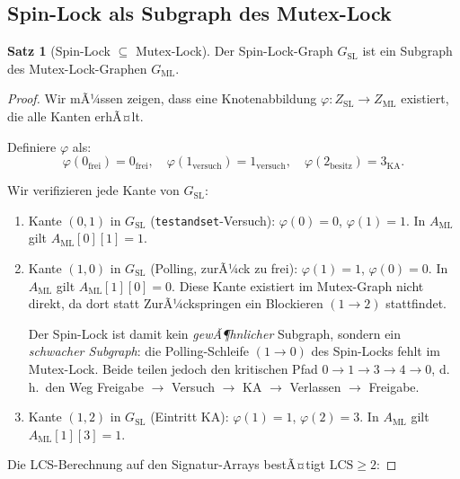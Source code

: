 ﻿\documentclass[a4paper,12pt]{article}
\theoremstyle{definition}
\newtheorem{satz}{Satz}
\begin{document}
\subsection{Spin-Lock als Subgraph des Mutex-Lock}

\begin{satz}[Spin-Lock $\subseteq$ Mutex-Lock]
  \label{satz:sl_ml}
  Der Spin-Lock-Graph $G_{\mathrm{SL}}$ ist ein Subgraph des
  Mutex-Lock-Graphen $G_{\mathrm{ML}}$.
\end{satz}

\begin{proof}
Wir mÃ¼ssen zeigen, dass eine Knotenabbildung
$\varphi: Z_{\mathrm{SL}} \to Z_{\mathrm{ML}}$ existiert, die alle Kanten
erhÃ¤lt.

Definiere $\varphi$ als:
\[
  \varphi(0_{\mathrm{frei}}) = 0_{\mathrm{frei}},\quad
  \varphi(1_{\mathrm{versuch}}) = 1_{\mathrm{versuch}},\quad
  \varphi(2_{\mathrm{besitz}}) = 3_{\mathrm{KA}}.
\]

Wir verifizieren jede Kante von $G_{\mathrm{SL}}$:

\begin{enumerate}
  \item Kante $(0, 1)$ in $G_{\mathrm{SL}}$ (\texttt{testandset}-Versuch):
        $\varphi(0) = 0$, $\varphi(1) = 1$.
        In $A_{\mathrm{ML}}$ gilt $A_{\mathrm{ML}}[0][1] = 1$.
        \checkmark

  \item Kante $(1, 0)$ in $G_{\mathrm{SL}}$ (Polling, zurÃ¼ck zu frei):
        $\varphi(1) = 1$, $\varphi(0) = 0$.
        In $A_{\mathrm{ML}}$ gilt $A_{\mathrm{ML}}[1][0] = 0$.
        Diese Kante existiert im Mutex-Graph nicht direkt, da dort statt
        ZurÃ¼ckspringen ein Blockieren $(1 \to 2)$ stattfindet.

        Der Spin-Lock ist damit kein \emph{gewÃ¶hnlicher} Subgraph, sondern
        ein \emph{schwacher Subgraph}: die Polling-Schleife $(1 \to 0)$ des
        Spin-Locks fehlt im Mutex-Lock. Beide teilen jedoch den kritischen
        Pfad $0 \to 1 \to 3 \to 4 \to 0$, d.\,h.\ den Weg
        Freigabe $\to$ Versuch $\to$ KA $\to$ Verlassen $\to$ Freigabe.

  \item Kante $(1, 2)$ in $G_{\mathrm{SL}}$ (Eintritt KA):
        $\varphi(1) = 1$, $\varphi(2) = 3$.
        In $A_{\mathrm{ML}}$ gilt $A_{\mathrm{ML}}[1][3] = 1$.
        \checkmark
\end{enumerate}

Die LCS-Berechnung auf den Signatur-Arrays bestÃ¤tigt $\mathrm{LCS} \geq 2$:


\end{proof}
\end{document}
